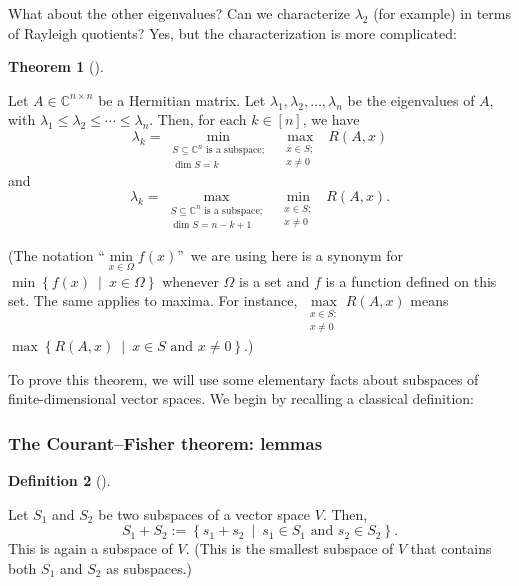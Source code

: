 \documentclass[numbers=enddot,12pt,final,onecolumn,notitlepage]{scrartcl}%
\numberwithin{exer}{subsection}
\theoremstyle{definition}
\newtheorem{theo}{Theorem}[subsection]
\newenvironment{theorem}[1][]
{\begin{theo}[#1]\begin{leftbar}}
{\end{leftbar}\end{theo}}
\newtheorem{defi}[theo]{Definition}
\newenvironment{definition}[1][]
{\begin{defi}[#1]\begin{leftbar}}
{\end{leftbar}\end{defi}}
\begin{document}
What about the other eigenvalues? Can we characterize $\lambda_{2}$ (for
example) in terms of Rayleigh quotients? Yes, but the characterization is more complicated:

\begin{theorem}
[Courant--Fisher theorem]\label{thm.herm.cour-fish}Let $A\in\mathbb{C}%
^{n\times n}$ be a Hermitian matrix. Let $\lambda_{1},\lambda_{2}%
,\ldots,\lambda_{n}$ be the eigenvalues of $A$, with $\lambda_{1}\leq
\lambda_{2}\leq\cdots\leq\lambda_{n}$. Then, for each $k\in\left[  n\right]
$, we have%
\begin{equation}
\lambda_{k}=\min\limits_{\substack{S\subseteq\mathbb{C}^{n}\text{ is a
subspace;}\\\dim S=k}}\ \ \max\limits_{\substack{x\in S;\\x\neq0}}\ \ R\left(
A,x\right)  \label{thm.herm.cour-fish.minmax}%
\end{equation}
and%
\begin{equation}
\lambda_{k}=\max\limits_{\substack{S\subseteq\mathbb{C}^{n}\text{ is a
subspace;}\\\dim S=n-k+1}}\ \ \min\limits_{\substack{x\in S;\\x\neq
0}}\ \ R\left(  A,x\right)  . \label{thm.herm.cour-fish.maxmin}%
\end{equation}


(The notation \textquotedblleft$\min\limits_{x\in\Omega}f\left(  x\right)
$\textquotedblright\ we are using here is a synonym for $\min\left\{  f\left(
x\right)  \ \mid\ x\in\Omega\right\}  $ whenever $\Omega$ is a set and $f$ is
a function defined on this set. The same applies to maxima. For instance,
$\max\limits_{\substack{x\in S;\\x\neq0}}R\left(  A,x\right)  $ means
$\max\left\{  R\left(  A,x\right)  \ \mid\ x\in S\text{ and }x\neq0\right\}  $.)
\end{theorem}

To prove this theorem, we will use some elementary facts about subspaces of
finite-dimensional vector spaces. We begin by recalling a classical definition:

\subsubsection{The Courant--Fisher theorem: lemmas}

\begin{definition}
\label{def.subspaces.sum}Let $S_{1}$ and $S_{2}$ be two subspaces of a vector
space $V$. Then,
\[
S_{1}+S_{2}:=\left\{  s_{1}+s_{2}\ \mid\ s_{1}\in S_{1}\text{ and }s_{2}\in
S_{2}\right\}  .
\]
This is again a subspace of $V$. (This is the smallest subspace of $V$ that
contains both $S_{1}$ and $S_{2}$ as subspaces.)
\end{definition}
\end{document}
